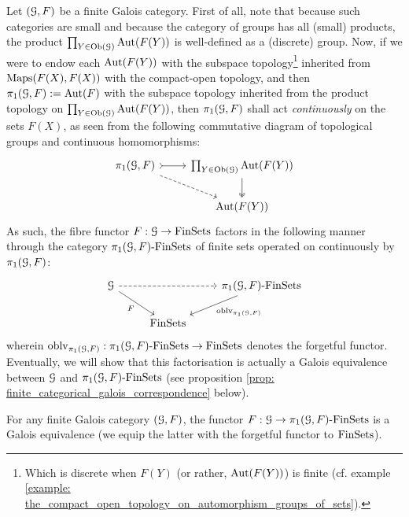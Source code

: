             \begin{remark} \label{remark: action_of_fundamental_groups_on_fibres_finite_galois_categories}
                Let $(\mathcal{G}, F)$ be a finite Galois category. First of all, note that because such categories are small and because the category of groups has all (small) products, the product $\prod_{Y \in \mathrm{Ob}(\mathcal{G})} \mathrm{Aut}(F(Y))$ is well-defined as a (discrete) group. Now, if we were to endow each $\mathrm{Aut}(F(Y))$ with the subspace topology\footnote{Which is discrete when $F(Y)$ (or rather, $\mathrm{Aut}(F(Y))$) is finite (cf. example \ref{example: the_compact_open_topology_on_automorphism_groups_of_sets}).} inherited from $\mathrm{Maps}(F(X), F(X))$ with the compact-open topology, and then $\pi_1(\mathcal{G}, F) := \mathrm{Aut}(F)$ with the subspace topology inherited from the product topology on $\prod_{Y \in \mathrm{Ob}(\mathcal{G})} \mathrm{Aut}(F(Y))$, then $\pi_1(\mathcal{G}, F)$ shall act \textit{continuously} on the sets $F(X)$, as seen from the following commutative diagram of topological groups and continuous homomorphisms:
                    $$
                        \begin{tikzcd}
                        	{\pi_1(\calG, F)} & {\prod_{Y \in \Ob(\calG)} \Aut(F(Y))} \\
                        	& {\Aut(F(Y))}
                        	\arrow[tail, from=1-1, to=1-2]
                        	\arrow[two heads, from=1-2, to=2-2]
                        	\arrow[dashed, from=1-1, to=2-2]
                        \end{tikzcd}
                    $$
                As such, the fibre functor $F: \mathcal{G} \to \mathrm{Fin}\mathrm{Sets}$ factors in the following manner through the category $\pi_1(\mathcal{G}, F)\text{-}\mathrm{Fin}\mathrm{Sets}$ of finite sets operated on continuously by $\pi_1(\mathcal{G}, F)$:
                    $$
                        \begin{tikzcd}
                        	\calG && {\pi_1(\calG, F)\-\Fin\Sets} \\
                        	& \Fin\Sets
                        	\arrow[dashed, from=1-1, to=1-3]
                        	\arrow["F"', from=1-1, to=2-2]
                        	\arrow["{\oblv_{\pi_1(\calG, F)}}", from=1-3, to=2-2]
                        \end{tikzcd}
                    $$
                wherein $\mathrm{oblv}_{\pi_1(\mathcal{G}, F)}: \pi_1(\mathcal{G}, F)\text{-}\mathrm{Fin}\mathrm{Sets} \to \mathrm{Fin}\mathrm{Sets}$ denotes the forgetful functor. Eventually, we will show that this factorisation is actually a Galois equivalence between $\mathcal{G}$ and $\pi_1(\mathcal{G}, F)\text{-}\mathrm{Fin}\mathrm{Sets}$ (see proposition \ref{prop: finite_categorical_galois_correspondence} below).
            \end{remark}
            \begin{proposition} \label{prop: finite_categorical_galois_correspondence}
                \cite[\href{https://stacks.math.columbia.edu/tag/0BN4}{Tag 0BN4}]{stacks} For any finite Galois category $(\mathcal{G}, F)$, the functor $F: \mathcal{G} \to \pi_1(\mathcal{G}, F)\text{-}\mathrm{Fin}\mathrm{Sets}$ is a Galois equivalence (we equip the latter with the forgetful functor to $\mathrm{Fin}\mathrm{Sets}$).
            \end{proposition}
            
